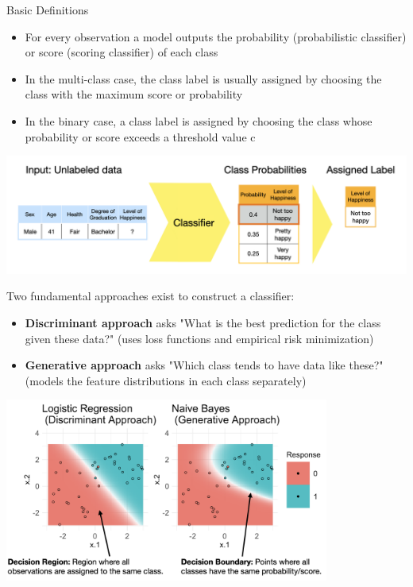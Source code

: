 \documentclass[11pt,compress,t,notes=noshow, xcolor=table]{beamer}
\begin{document}
\begin{vbframe}{Basic Definitions}
\begin{itemize}
\item \small For every observation a model outputs the probability (probabilistic classifier) or score (scoring classifier) of each class
\item \small In the multi-class case, the class label is usually assigned by choosing the class with the maximum score or probability
\item \small In the binary case, a class label is assigned by choosing the class whose probability or score exceeds a threshold value c
\end{itemize}

\vspace{5mm}

\begin{center}
  \includegraphics[width = \textwidth]{figure_man/nutshell-classification-label-assignment}
\end{center}

Two fundamental approaches exist to construct a classifier:
\begin{itemize}
\item \small \textbf{Discriminant approach} asks "What is the best prediction for the class given these data?" (uses loss functions and empirical risk minimization)
\item \small \textbf{Generative approach} asks "Which class tends to have data like these?" (models the feature distributions in each class separately)

\end{itemize}

\begin{center}
  \includegraphics[width = 0.8\textwidth]{figure_man/nutshell_classif_binary_task}
\end{center}
\end{vbframe}
\end{document}
